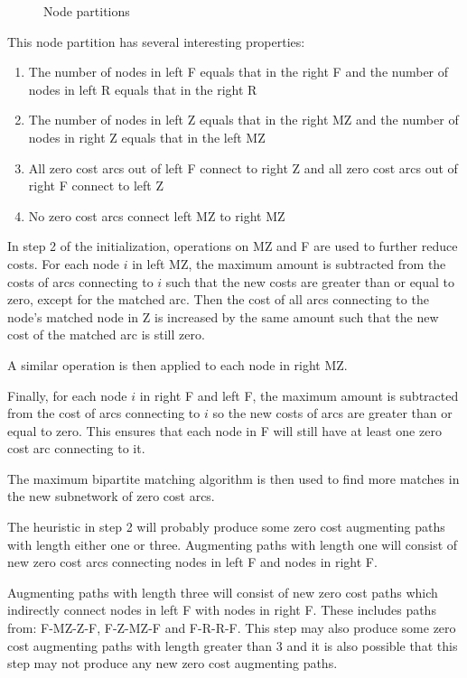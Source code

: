 \begin{figure}[htb]
{}
\caption{\label{figg1}Node partitions }
\end{figure}

This node partition has several interesting properties:

\begin{enumerate}

\item The number of nodes in left F equals that in the right F and
the number of nodes in left R equals that in the right R

\item The number of nodes in left Z equals that in the right MZ and
the number of nodes in right Z equals that in the left MZ

\item All zero cost arcs out of left F connect to right Z and
all zero cost arcs out of right F connect to left Z

\item No zero cost arcs connect left MZ to right MZ

\end{enumerate}

In step 2 of the initialization,
operations on MZ and F are used to further reduce costs.
For each node $i$ in left MZ, the maximum amount is subtracted from
the costs of arcs connecting to $i$ such that the new costs are greater than
or equal to zero, except for the matched arc.  Then the cost of all
arcs connecting to the node's matched node in Z is increased by the
same amount such that the new cost of the matched arc is still zero.

A similar operation is then applied to each node in right MZ.

Finally, for each node $i$ in right F and left F, the maximum amount
is subtracted from the cost of arcs connecting to $i$ so the new costs
of arcs are greater than or equal to zero. This ensures that each node
in F will still have at least one zero cost arc connecting to it.

The maximum bipartite matching algorithm is then used to find more
matches in the new subnetwork of zero cost arcs.

The heuristic in step 2 will probably produce some zero cost
augmenting paths with length either one or three. Augmenting paths
with length one will consist of new zero cost arcs connecting nodes in
left F and nodes in right F.

Augmenting paths with length three will consist of new zero cost paths
which indirectly connect nodes in left F with nodes in right F.  These
includes paths from: F-MZ-Z-F, F-Z-MZ-F and F-R-R-F.  This step may
also produce some zero cost augmenting paths with length greater than
3 and it is also possible that this step may not produce any new zero
cost augmenting paths.

